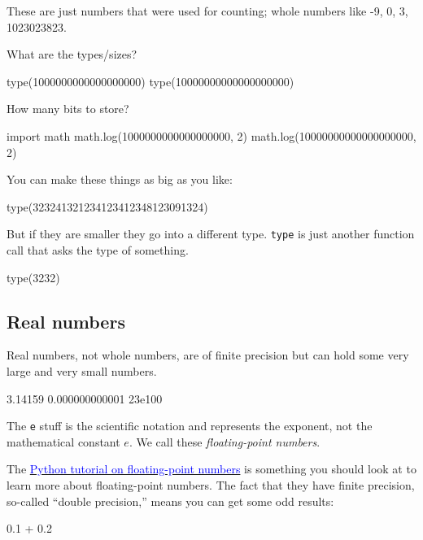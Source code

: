 \documentclass[titlepage]{tufte-book}
\begin{document}
\begin{fullwidth}
These are just numbers that were used for counting; whole numbers like -9, 0, 3, 1023023823.

What are the types/sizes?

\begin{pyconsole}[b]
type(1000000000000000000)
type(10000000000000000000)
\end{pyconsole}

How many bits to store?

\begin{pyconsole}[b]
import math
math.log(1000000000000000000, 2)
math.log(10000000000000000000, 2)
\end{pyconsole}

You can make these things as big as you like:
 
\begin{pyconsole}[a]
type(323241321234123412348123091324)
\end{pyconsole}

But if they are smaller they go into a different type. {\tt type} is just another function call that asks the type of something.

\begin{pyconsole}[b]
type(3232)
\end{pyconsole}


\subsection{Real numbers}
 
Real numbers, not whole numbers, are of finite precision but can hold some very large and very small numbers.

\begin{pyconsole}[c]
3.14159
0.000000000001
23e100
\end{pyconsole}

The {\tt e} stuff is the scientific notation and represents the exponent, not the mathematical constant $e$. We call these {\em floating-point numbers}.

The \href{https://docs.python.org/2/tutorial/floatingpoint.html}{\textcolor{blue}{Python tutorial on floating-point numbers}} is something you should look at to learn more about floating-point numbers. The fact that they have finite precision, so-called ``double precision,'' means you can get some odd results:

\begin{pyconsole}[z]
0.1 + 0.2
\end{pyconsole}


\end{fullwidth}
\end{document}
